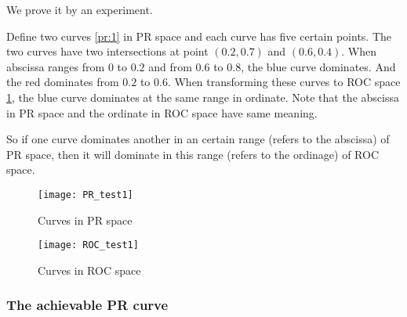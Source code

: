 \documentclass[a4paper,12pt]{article}
\begin{document}
\begin{itemize}
We prove it by an experiment.

Define two curves \ref{pr:1} in PR space and each curve has five certain points. The two curves have two intersections at point $(0.2,0.7)$ and $(0.6,0.4)$. When abscissa ranges from $0$ to $0.2$ and from $0.6$ to $0.8$, the blue curve dominates. And the red dominates from $0.2$ to $0.6$. When transforming these curves to ROC space \ref{roc:1}, the blue curve dominates at the same range in ordinate. Note that the abscissa in PR space and the ordinate in ROC space have same meaning.

So if one curve dominates another in an certain range (refers to the abscissa) of PR space, then it will dominate in this range (refers to the ordinage) of ROC space. 
 
\begin{figure}[!ht]
\begin{minipage}[t]{0.5\textwidth}
\centering\texttt{[image: PR\_test1]}
\caption{Curves in PR space}\label{pr:1}
\end{minipage}
\begin{minipage}[t]{0.5\textwidth}
\centering\texttt{[image: ROC\_test1]}
\caption{Curves in ROC space}\label{roc:1}
\end{minipage}
\end{figure}
\end{itemize}

\subsubsection{The achievable PR curve}
\end{document}
